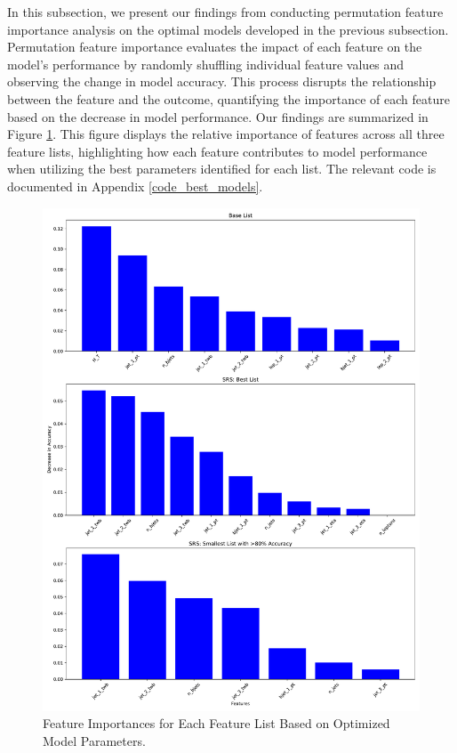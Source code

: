 \documentclass[]{article}
\begin{document}
In this subsection, we present our findings from conducting permutation feature importance analysis on the optimal models developed in the previous subsection. Permutation feature importance evaluates the impact of each feature on the model's performance by randomly shuffling individual feature values and observing the change in model accuracy. This process disrupts the relationship between the feature and the outcome, quantifying the importance of each feature based on the decrease in model performance. Our findings are summarized in Figure \ref{fig:best_models_feature_ranking}. This figure displays the relative importance of features across all three feature lists, highlighting how each feature contributes to model performance when utilizing the best parameters identified for each list.  The relevant code is documented in Appendix \ref{code_best_models}.

\begin{figure}[h!]
	\centering
	\includegraphics[width=\linewidth]{best_model/feature_importances.pdf}
	\caption{Feature Importances for Each Feature List Based on Optimized Model Parameters. }
	\label{fig:best_models_feature_ranking}
\end{figure}
\end{document}
